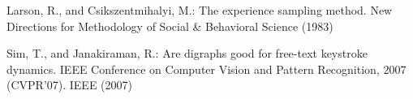 \documentclass[runningheads,a4paper]{llncs}
\begin{document}
\begin{thebibliography}{4}


 Larson, R., and Csikszentmihalyi, M.: The experience sampling method. New Directions for Methodology of Social & Behavioral Science (1983)

 Sim, T., and Janakiraman, R.: Are digraphs good for free-text keystroke dynamics. IEEE Conference on Computer Vision and Pattern Recognition, 2007 (CVPR'07). IEEE (2007)
  
\end{thebibliography}
\end{document}
